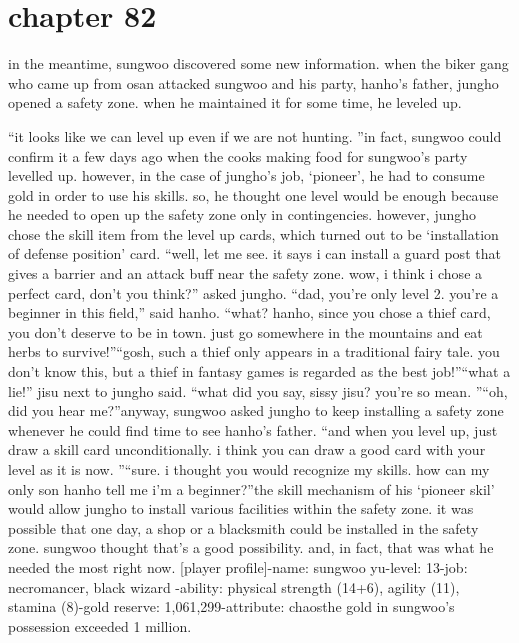 \section{chapter 82}

                            in the meantime, sungwoo discovered some new information.
 when the biker gang who came up from osan attacked sungwoo and his party, hanho’s father, jungho opened a safety zone.
 when he maintained it for some time, he leveled up.





“it looks like we can level up even if we are not hunting.
”in fact, sungwoo could confirm it a few days ago when the cooks making food for sungwoo’s party levelled up.
however, in the case of jungho’s job, ‘pioneer’, he had to consume gold in order to use his skills.
 so, he thought one level would be enough because he needed to open up the safety zone only in contingencies.
however, jungho chose the skill item from the level up cards, which turned out to be ‘installation of defense position’ card.
“well, let me see.
 it says i can install a guard post that gives a barrier and an attack buff near the safety zone.
 wow, i think i chose a perfect card, don’t you think?” asked jungho.
“dad, you’re only level 2.
 you’re a beginner in this field,” said hanho.
“what? hanho, since you chose a thief card, you don’t deserve to be in town.
 just go somewhere in the mountains and eat herbs to survive!”“gosh, such a thief only appears in a traditional fairy tale.
 you don’t know this, but a thief in fantasy games is regarded as the best job!”“what a lie!” jisu next to jungho said.
“what did you say, sissy jisu? you’re so mean.
”“oh, did you hear me?”anyway, sungwoo asked jungho to keep installing a safety zone whenever he could find time to see hanho’s father.
“and when you level up, just draw a skill card unconditionally.
 i think you can draw a good card with your level as it is now.
”“sure.
 i thought you would recognize my skills.
 how can my only son hanho tell me i’m a beginner?”the skill mechanism of his ‘pioneer skil’ would allow jungho to install various facilities within the safety zone.
it was possible that one day, a shop or a blacksmith could be installed in the safety zone.
sungwoo thought that’s a good possibility.
and, in fact, that was what he needed the most right now.
[player profile]-name: sungwoo yu-level: 13-job: necromancer, black wizard
-ability: physical strength (14+6), agility (11), stamina (8)-gold reserve: 1,061,299-attribute: chaosthe gold in sungwoo’s possession exceeded 1 million.
